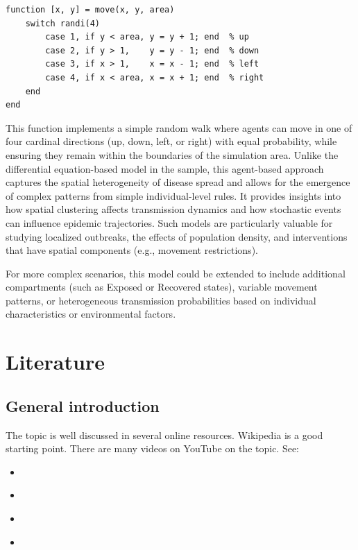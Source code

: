 \documentclass{article}
\begin{document}
\begin{lstlisting}[caption={Move function)}]
function [x, y] = move(x, y, area)
    switch randi(4)
        case 1, if y < area, y = y + 1; end  % up
        case 2, if y > 1,    y = y - 1; end  % down
        case 3, if x > 1,    x = x - 1; end  % left
        case 4, if x < area, x = x + 1; end  % right
    end
end
\end{lstlisting}

This function implements a simple random walk where agents can move in one of four cardinal directions (up, down, left, or right) with equal probability, while ensuring they remain within the boundaries of the simulation area.
Unlike the differential equation-based model in the sample, this agent-based approach captures the spatial heterogeneity of disease spread and allows for the emergence of complex patterns from simple individual-level rules. It provides insights into how spatial clustering affects transmission dynamics and how stochastic events can influence epidemic trajectories. Such models are particularly valuable for studying localized outbreaks, the effects of population density, and interventions that have spatial components (e.g., movement restrictions).

For more complex scenarios, this model could be extended to include additional compartments (such as Exposed or Recovered states), variable movement patterns, or heterogeneous transmission probabilities based on individual characteristics or environmental factors.

\section{Literature}
\subsection{General introduction}
The topic is well discussed in several online resources. Wikipedia is a good starting point. There are many videos on YouTube on the topic. See:
\begin{itemize}
    \item \textcite{AgentBasedModel_Wiki}
    \item \textcite{AgentBasedModel_Macal2010}
    \item \textcite{AgentBasedModel_Macal2014}
    \item \textcite{AgentBasedModel_Sayama}
\end{itemize}
\end{document}
